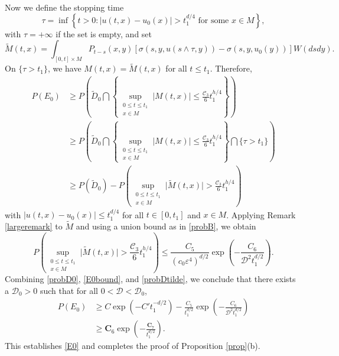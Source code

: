 \documentclass[12pt]{amsart}
\numberwithin{equation}{section}
\newcommand{\1}{\mathbf{1}}
\begin{document}
Now we define the stopping time
\[\tau=\inf\left\lbrace t>0:\vert u(t,x)-u_0(x)\vert>t_1^{d/4}\text{~for some $x\in M$}\right\rbrace,\]
with $\tau=+\infty$ if the set is empty, and set
\[\widetilde{M}(t,x)=\int_{[0,t]\times M}P_{t-s}(x,y)[\sigma(s,y,u(s\wedge \tau,y))-\sigma(s,y,u_0(y))]W(dsdy).\]
On $\{\tau>t_1\}$, we have $M(t,x)=\widetilde M(t,x)$ for all $t\le t_1$. Therefore,
\begin{equation}
\label{E0bound}
\begin{split}
P(E_{0})&\geq P\left(\widetilde{D}_0\bigcap \left\lbrace \sup_{\substack{0\leq t\leq t_1\\ x\in M}}\vert M(t,x)\vert\leq\frac{\mathcal{C}_3}{6}t_1^{h/4}\right\rbrace\right)\\
&\geq P\left(\widetilde{D}_0\bigcap \left\lbrace \sup_{\substack{0\leq t\leq t_1\\ x\in M}}\vert M(t,x)\vert\leq\frac{\mathcal{C}_3}{6}t_1^{h/4}\right\rbrace\bigcap\{\tau>t_1\}\right)\\
&\geq P(\widetilde{D}_0)-P\left( \sup_{\substack{0\leq t\leq t_1\\ x\in M}}\vert \widetilde{M}(t,x)\vert>\frac{\mathcal{C}_3}{6}t_1^{h/4}\right)
\end{split}
\end{equation}
with $\vert u(t,x)-u_0(x)\vert\leq t_1^{d/4}$ for all $t\in[0,t_1]$ and $x\in M$. Applying Remark \ref{largeremark} to $\widetilde M$ and using a union bound as in \eqref{probB}, we obtain
\begin{equation}
\label{probDtilde}
P\left( \sup_{\substack{0\leq t\leq t_1\\ x\in M}}\vert \widetilde{M}(t,x)\vert>\frac{\mathcal{C}_3}{6}t_1^{h/4}\right)\leq \frac{C_5}{(c_0\varepsilon^4)^{d/2}}\exp\left(-\frac{C_6}{\mathcal{D}^2 t_1^{d/2}}\right).
\end{equation}
Combining \eqref{probD0}, \eqref{E0bound}, and \eqref{probDtilde}, we conclude that there exists a $\mathcal{D}_0>0$ such that for all $0<\mathcal{D}<\mathcal{D}_0$,
\begin{equation*}
\begin{split}
P(E_{0})&\geq C\exp\left(-C't_1^{-d/2}\right)-\frac{C_5}{t_1^{d/2}}\exp\left(-\frac{C_6}{\mathcal{D}^2 t_1^{d/2}}\right)\\
&\geq \textbf{C}_6\exp\left(-\frac{\textbf{C}_7}{t_1^{d/2}}\right).
\end{split}
\end{equation*}
This establishes \eqref{E0} and completes the proof of Proposition \ref{prop}(b).



\end{document}
